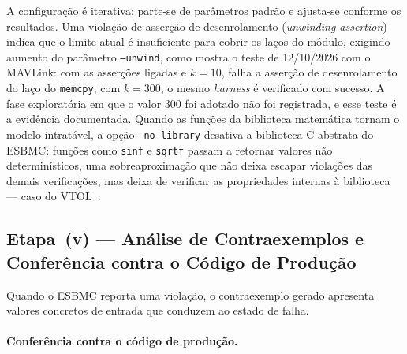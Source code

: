 A configuração é iterativa: parte-se de parâmetros padrão e ajusta-se conforme
os resultados. Uma violação de asserção de desenrolamento (\textit{unwinding
assertion}) indica que o limite atual é insuficiente para cobrir os laços do
módulo, exigindo aumento do parâmetro \texttt{--unwind}, como mostra o teste de 12/10/2026 com o MAVLink: com as asserções
ligadas e $k = 10$, falha a asserção de desenrolamento do laço do \texttt{memcpy}; com
$k = 300$, o mesmo \textit{harness} é verificado com sucesso. A fase exploratória em que
o valor 300 foi adotado não foi registrada, e esse teste é a evidência documentada. Quando as funções da biblioteca matemática
tornam o modelo intratável, a opção \texttt{--no-library} desativa a biblioteca C
abstrata do ESBMC: funções como \texttt{sinf} e \texttt{sqrtf} passam a
retornar valores não determinísticos, uma sobreaproximação que não deixa escapar
violações das demais verificações, mas deixa de verificar as propriedades
internas à biblioteca --- caso do VTOL~\cite{ESBMC_GitHub}.

\subsection{Etapa~(v) --- Análise de Contraexemplos e Conferência contra o Código de Produção}

Quando o ESBMC reporta uma violação, o contraexemplo gerado
apresenta valores concretos de entrada que conduzem ao estado de falha.


\paragraph{Conferência contra o código de produção.}
\label{subsec:etapa-replay}

